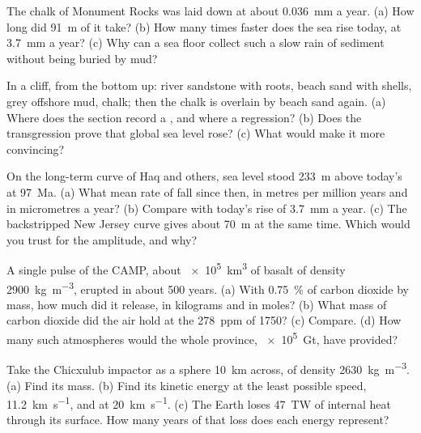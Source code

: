 \begin{exercise}[$\star$]\label{exo:b2:phanerozoic-earth:3}
The chalk of Monument Rocks was laid down at about \qty{0.036}{mm} a year. (a) How long did
\qty{91}{m} of it take? (b) How many times faster does the sea rise today, at \qty{3.7}{mm} a
year? (c) Why can a sea floor collect such a slow rain of sediment without being buried by mud?
\end{exercise}

\begin{exercise}[$\star$]\label{exo:b2:phanerozoic-earth:4}
In a cliff, from the bottom up: river sandstone with roots, beach sand with shells, grey offshore
mud, chalk; then the chalk is overlain by beach sand again. (a) Where does the section record a
, and where a regression? (b) Does the transgression prove that global sea
level rose? (c) What would make it more convincing?
\end{exercise}

\begin{exercise}[$\star\star$]\label{exo:b2:phanerozoic-earth:5}
On the long-term curve of Haq and others, sea level stood \qty{233}{m} above today's at
\qty{97}{Ma}. (a) What mean rate of fall since then, in metres per million years and in
micrometres a year? (b) Compare with today's rise of \qty{3.7}{mm} a year. (c) The backstripped
New Jersey curve gives about \qty{70}{m} at the same time. Which would you trust for the
amplitude, and why?
\end{exercise}

\begin{exercise}[$\star\star$]\label{exo:b2:phanerozoic-earth:6}
A single pulse of the CAMP, about \qty{e5}{km^3} of basalt of density \qty{2900}{kg.m^{-3}},
erupted in about 500 years. (a) With \qty{0.75}{\percent} of carbon dioxide by mass, how much
did it release, in kilograms and in moles? (b) What mass of carbon dioxide did the air hold at
the \qty{278}{ppm} of 1750? (c) Compare. (d) How many such atmospheres would the whole province,
\qty{e5}{Gt}, have provided?
\end{exercise}

\begin{exercise}[$\star\star$]\label{exo:b2:phanerozoic-earth:7}
Take the Chicxulub impactor as a sphere \qty{10}{km} across, of density
\qty{2630}{kg.m^{-3}}. (a) Find its mass. (b) Find its kinetic energy at the least possible
speed, \qty{11.2}{km.s^{-1}}, and at \qty{20}{km.s^{-1}}. (c) The Earth loses \qty{47}{TW} of
internal heat through its surface. How many years of that loss does each energy represent?
\end{exercise}

